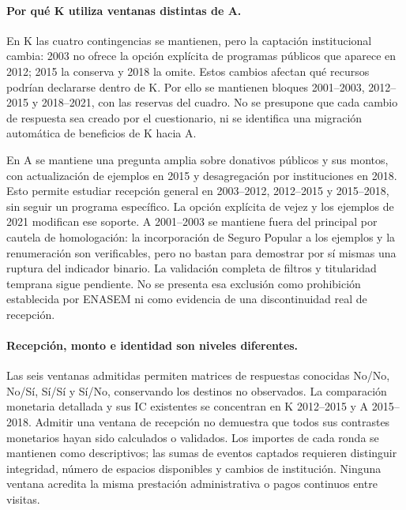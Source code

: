 
\FloatBarrier

\paragraph{Por qué K utiliza ventanas distintas de A.}
En K las cuatro contingencias se mantienen, pero la captación institucional
cambia: 2003 no ofrece la opción explícita de programas públicos que
aparece en 2012; 2015 la conserva y 2018 la omite. Estos cambios afectan
qué recursos podrían declararse dentro de K. Por ello se mantienen bloques
2001--2003, 2012--2015 y 2018--2021, con las reservas del cuadro.
No se presupone que cada cambio de respuesta sea creado por el cuestionario,
ni se identifica una migración automática de beneficios de K hacia A.

En A se mantiene una pregunta amplia sobre donativos públicos y sus montos,
con actualización de ejemplos en 2015 y desagregación por instituciones
en 2018. Esto permite estudiar recepción general en 2003--2012,
2012--2015 y 2015--2018, sin seguir un programa específico.
La opción explícita de vejez y los ejemplos de 2021 modifican ese soporte.
A 2001--2003 se mantiene fuera del principal por cautela de homologación:
la incorporación de Seguro Popular a los ejemplos y la renumeración son
verificables, pero no bastan para demostrar por sí mismas una ruptura del
indicador binario. La validación completa de filtros y titularidad temprana
sigue pendiente. No se presenta esa exclusión como prohibición establecida
por ENASEM ni como evidencia de una discontinuidad real de recepción.

\paragraph{Recepción, monto e identidad son niveles diferentes.}
Las seis ventanas admitidas permiten matrices de respuestas conocidas
No/No, No/Sí, Sí/Sí y Sí/No, conservando los destinos no observados.
La comparación monetaria detallada y sus IC existentes se concentran en
K 2012--2015 y A 2015--2018. Admitir una ventana de recepción no demuestra
que todos sus contrastes monetarios hayan sido calculados o validados.
Los importes de cada ronda se mantienen como descriptivos; las sumas de
eventos captados requieren distinguir integridad, número de espacios
disponibles y cambios de institución. Ninguna ventana acredita la misma
prestación administrativa o pagos continuos entre visitas.


